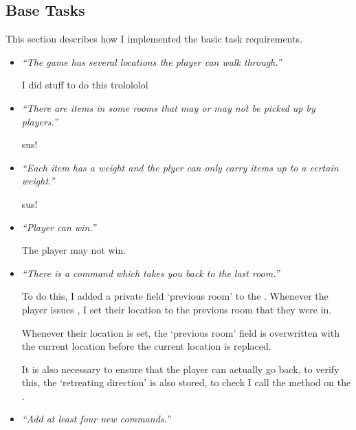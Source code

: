 \documentclass{article}
\begin{document}
\begin{multicols}{2}
        \section{Base Tasks}

            This section describes how I implemented the basic task requirements.

            \begin{itemize}[leftmargin=*]
                \item \textit{``The game has several locations the player can walk through.''}
                
                    I did stuff to do this trolololol

                \item \textit{``There are items in some rooms that may or may not be picked up by players.''}
                
                    sus!
                
                \item \textit{``Each item has a weight and the plyer can only carry items up to a certain weight.''}
                
                    sus!
                
                \item \textit{``Player can win.''}
                
                    The player may not win.

                \item \textit{``There is a command}  \textit{which takes you back to the last room.''}
                
                    To do this, I added a private field `previous room' to the . Whenever the player issues , I set their location to the previous room that they were in.
                    
                    Whenever their location is set, the `previous room' field is overwritten with the current location before the current location is replaced.

                    It is also necessary to ensure that the player can actually go back, to verify this, the `retreating direction' is also stored, to check I call the method  on the .

                \item \textit{``Add at least four new commands.''}
                

\end{itemize}
\end{multicols}
\end{document}
